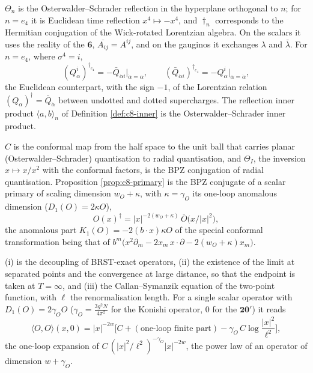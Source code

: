 \begin{remark}
$\Theta_n$ is the Osterwalder--Schrader reflection in the hyperplane orthogonal to $n$; for $n=e_4$ it is Euclidean time reflection $x^4\mapsto-x^4$, and $\dagger_n$ corresponds to the Hermitian conjugation of the Wick-rotated Lorentzian algebra. On the scalars it uses the reality of the $\mathbf6$, $\overline{A_{ij}}=A^{ij}$, and on the gauginos it exchanges $\lambda$ and $\bar\lambda$. For $n=e_4$, where $\sigma^4=i$,
\[
(Q^i_\alpha)^{\dagger_{e_4}}=-\bar Q_{\dot\alpha i}\big|_{\dot\alpha=\alpha},\qquad (\bar Q_{\dot\alpha i})^{\dagger_{e_4}}=-Q^i_\alpha\big|_{\alpha=\dot\alpha},
\]
the Euclidean counterpart, with the sign $-1$, of the Lorentzian relation $(Q_\alpha)^\dagger=\bar Q_{\dot\alpha}$ between undotted and dotted supercharges. The reflection inner product $\langle a,b\rangle_n$ of Definition \ref{def:c8-inner} is the Osterwalder--Schrader inner product.
\end{remark}

\begin{remark}
$C$ is the conformal map from the half space to the unit ball that carries planar (Osterwalder--Schrader) quantisation to radial quantisation, and $\Theta_I$, the inversion $x\mapsto x/x^2$ with the conformal factors, is the BPZ conjugation of radial quantisation. Proposition \ref{prop:c8-primary} is the BPZ conjugate of a scalar primary of scaling dimension $w_O+\kappa$, with $\kappa=\gamma_O$ its one-loop anomalous dimension ($D_1(O)=2\kappa O$),
\[
O(x)^\dagger=|x|^{-2(w_O+\kappa)}\,\overline O\big(x/|x|^2\big),
\]
the anomalous part $K_1(O)=-2(b\cdot x)\kappa O$ of the special conformal transformation being that of $b^m\big(x^2\partial_m-2x_m\,x\cdot\partial-2(w_O+\kappa)x_m\big)$.
\end{remark}

\begin{remark}
(i) is the decoupling of BRST-exact operators, (ii) the existence of the limit at separated points and the convergence at large distance, so that the endpoint is taken at $T=\infty$, and (iii) the Callan--Symanzik equation of the two-point function, with $\ell$ the renormalisation length. For a single scalar operator with $D_1(O)=2\gamma_OO$ ($\gamma_O=\frac{3g^2N}{4\pi^2}$ for the Konishi operator, $0$ for the $\mathbf{20'}$) it reads
\[
\langle O,O\rangle(x,0)=|x|^{-2w}\Big[C+(\text{one-loop finite part})-\gamma_O\,C\log\frac{|x|^2}{\ell^2}\Big],
\]
the one-loop expansion of $C\,(|x|^2/\ell^2)^{-\gamma_O}|x|^{-2w}$, the power law of an operator of dimension $w+\gamma_O$.
\end{remark}

